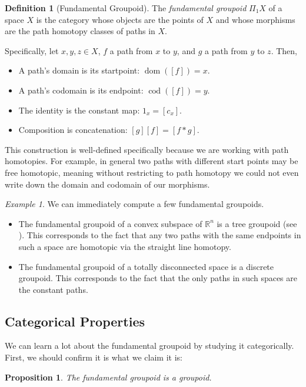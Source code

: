 \documentclass[11 pt]{amsart}
\theoremstyle{plain}   %
\newtheorem{prop}{Proposition}[section]
\theoremstyle{definition}
\newtheorem{defn}{Definition}[section]
\theoremstyle{remark}
\newtheorem{ex}{Example}[section]
\numberwithin{equation}{section}
\def\RR{\mathbb{R}}
\DeclareMathOperator{\dom}{dom}
\DeclareMathOperator{\cod}{cod}
\begin{document}
\begin{defn}[Fundamental Groupoid]
	The \textit{fundamental groupoid} $\Pi_1X$ of a space $X$ is the category
	whose objects are the points of $X$ and whose morphisms are the path homotopy
	classes of paths in $X$.
\end{defn}

Specifically, let $x,y,z\in X$, $f$ a path from $x$ to $y$, and $g$ a path from
$y$ to $z$. Then,

\begin{itemize}
	\item A path's domain is its startpoint: $\dom([f]) = x$.
	\item A path's codomain is its endpoint: $\cod([f]) = y$.
	\item The identity is the constant map: $1_x = [c_x]$.
	\item Composition is concatenation: $[g][f] = [f*g]$.
\end{itemize}

This construction is well-defined specifically because we are working with path
homotopies. For example, in general two paths with different start points may be
free homotopic, meaning without restricting to path homotopy we could not even
write down the domain and codomain of our morphisms.

\begin{ex}\cite[p. 213]{Brown}
	We can immediately compute a few fundamental groupoids.
	\begin{itemize}
		\item The fundamental groupoid of a convex subspace of $\RR^n$ is a tree
		      groupoid (see ). This corresponds to the fact that
		      any two paths with the same endpoints in such a space are homotopic via
		      the straight line homotopy.
		\item The fundamental groupoid of a totally disconnected space is a discrete
		      groupoid. This corresponds to the fact that the only paths in such spaces
		      are the constant paths.
	\end{itemize}
\end{ex}

\subsection{Categorical Properties} We can learn a lot about the fundamental
groupoid by studying it categorically. First, we should confirm it is what we
claim it is:

\begin{prop}\label{fundamental groupoid is a groupoid}
	The fundamental groupoid is a groupoid.
\end{prop}
\end{document}
